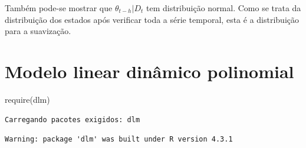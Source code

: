 \documentclass[
  letterpaper,
  DIV=11,
  numbers=noendperiod]{scrreprt}
\newenvironment{Shaded}{\begin{snugshade}}{\end{snugshade}}
\newcommand{\FunctionTok}[1]{\textcolor[rgb]{0.28,0.35,0.67}{#1}}
\newcommand{\NormalTok}[1]{\textcolor[rgb]{0.00,0.23,0.31}{#1}}
\begin{document}
Também pode-se mostrar que \(\theta_{t-h}|D_t\) tem distribuição normal.
Como se trata da distribuição dos estados após verificar toda a série
temporal, esta é a distribuição para a suavização.


\hypertarget{modelo-linear-dinuxe2mico-polinomial}{%
\chapter{Modelo linear dinâmico
polinomial}\label{modelo-linear-dinuxe2mico-polinomial}}

\begin{Shaded}
\begin{Highlighting}[]
\FunctionTok{require}\NormalTok{(dlm)}
\end{Highlighting}
\end{Shaded}

\begin{verbatim}
Carregando pacotes exigidos: dlm
\end{verbatim}

\begin{verbatim}
Warning: package 'dlm' was built under R version 4.3.1
\end{verbatim}
\end{document}
